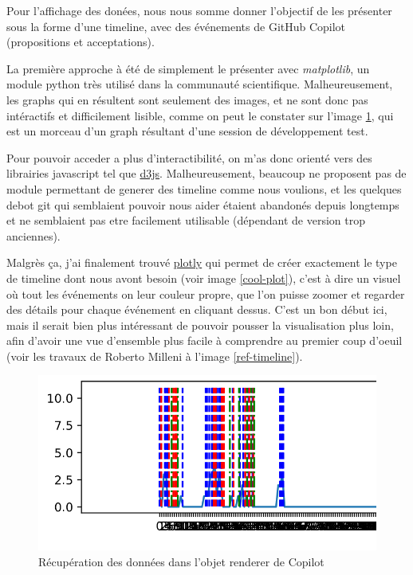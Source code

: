 Pour l'affichage des donées, nous nous somme donner l'objectif de les présenter sous la forme d'une timeline, avec des événements de GitHub Copilot (propositions et acceptations).

La première approche à été de simplement le présenter avec \emph{matplotlib}, un module python très utilisé dans la communauté scientifique.
Malheureusement, les graphs qui en résultent sont seulement des images, et ne sont donc pas intéractifs et difficilement lisible, comme on peut le constater sur l'image \ref{matplotlib-timeline},
qui est un morceau d'un graph résultant d'une session de développement test.

Pour pouvoir acceder a plus d'interactibilité, on m'as donc orienté vers des librairies javascript tel que \href{https://d3js.org}{d3js}.
Malheureusement, beaucoup ne proposent pas de module permettant de generer des timeline comme nous voulions, et les quelques debot git qui semblaient pouvoir nous aider étaient abandonés depuis longtemps
et ne semblaient pas etre facilement utilisable (dépendant de version trop anciennes).

Malgrès ça, j'ai finalement trouvé \href{https://plotly.com/python/}{plotly} qui permet de créer exactement le type de timeline dont nous avont besoin (voir image \ref{cool-plot}),
c'est à dire un visuel où tout les événements on leur couleur propre, que l'on puisse zoomer et regarder des détails pour chaque événement en cliquant dessus.
C'est un bon début ici, mais il serait bien plus intéressant de pouvoir pousser la visualisation plus loin, afin d'avoir une vue d'ensemble plus facile à comprendre au premier coup d'oeuil
(voir les travaux de Roberto Milleni \cite{cool-plot} à l'image \ref{ref-timeline}).

\begin{figure}
  \centering
  \includegraphics[width=15cm]{images/matplotlib-timeline.png}
  \caption{Récupération des données dans l'objet renderer de Copilot}
  \label{matplotlib-timeline}
\end{figure}

